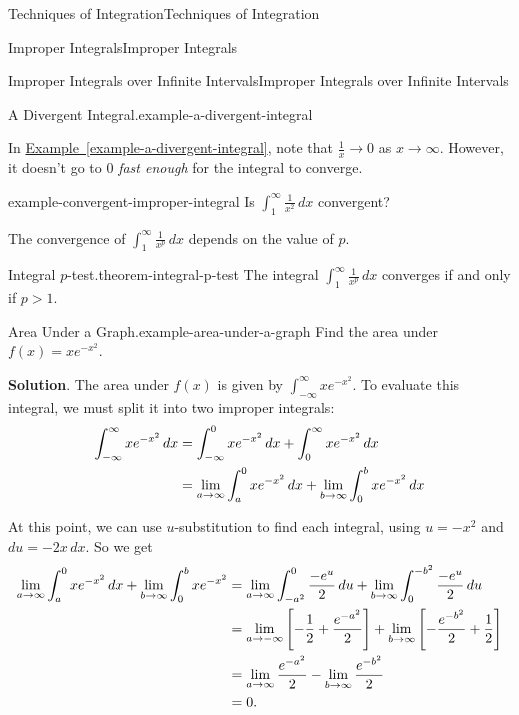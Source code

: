 \documentclass[10pt,]{book}
\numberwithin{equation}{section}
\newcommand{\gt}{>}
\begin{document}
\begin{chapterptx}{Techniques of Integration}{}{Techniques of Integration}{}{}
\begin{sectionptx}{Improper Integrals}{}{Improper Integrals}{}{}
\begin{subsectionptx}{Improper Integrals over Infinite Intervals}{}{Improper Integrals over Infinite Intervals}{}{}
\begin{example}{A Divergent Integral.}{example-a-divergent-integral}
\end{example}
\hypertarget{p-584}{}%
In \hyperref[example-a-divergent-integral]{Example~\ref{example-a-divergent-integral}}, note that \(\frac{1}{x}\to0\) as \(x\to\infty\). However, it doesn't go to \(0\) \emph{fast enough} for the integral to converge.%
\begin{example}{}{example-convergent-improper-integral}%
\hypertarget{p-585}{}%
Is \(\int_{1}^{\infty}\frac{1}{x^{2}}\,dx\) convergent?%
\end{example}
\hypertarget{p-586}{}%
The convergence of \(\int_{1}^{\infty}\frac{1}{x^{p}}\,dx\) depends on the value of \(p\).%
\begin{theorem}{Integral \(p\)-test.}{}{theorem-integral-p-test}%
\hypertarget{p-587}{}%
The integral \(\int_{1}^{\infty}\frac{1}{x^{p}}\,dx\) converges if and only if \(p \gt 1\).%
\end{theorem}
\begin{example}{Area Under a Graph.}{example-area-under-a-graph}%
\hypertarget{p-588}{}%
Find the area under \(f(x) = xe^{-x^{2}}\).%
\par\smallskip%
\noindent\textbf{Solution}.\hypertarget{solution-127}{}\quad%
\hypertarget{p-589}{}%
The area under \(f(x)\) is given by \(\int_{-\infty}^{\infty}xe^{-x^{2}}\). To evaluate this integral, we must split it into two improper integrals:%
\begin{align*}
\int_{-\infty}^{\infty}xe^{-x^{2}}\,dx & = \int_{-\infty}^{0}xe^{-x^{2}}\,dx + \int_{0}^{\infty}xe^{-x^{2}}\,dx \\
& = \lim_{a\to\-\infty}\int_{a}^{0}xe^{-x^{2}}\,dx + \lim_{b\to\infty}\int_{0}^{b}xe^{-x^{2}}\,dx 
\end{align*}
%
\par
\hypertarget{p-590}{}%
At this point, we can use \(u\)-substitution to find each integral, using \(u = -x^{2}\) and \(du = -2x\,dx\). So we get%
\begin{align*}
\lim_{a\to\-\infty}\int_{a}^{0}xe^{-x^{2}}\,dx + \lim_{b\to\infty}\int_{0}^{b}xe^{-x^{2}} & = \lim_{a\to\-\infty}\int_{-a^{2}}^{0}\frac{-e^{u}}{2}\,du + \lim_{b\to\infty}\int_{0}^{-b^{2}}\frac{-e^{u}}{2}\,du \\
& = \lim_{a\to-\infty}\left[-\frac{1}{2} + \frac{e^{-a^{2}}}{2}\right] + \lim_{b\to\infty}\left[-\frac{e^{-b^{2}}}{2} + \frac{1}{2}\right]\\
& = \lim_{a\to\infty}\frac{e^{-a^{2}}}{2} - \lim_{b\to\infty}\frac{e^{-b^{2}}}{2} \\
& = 0. 
\end{align*}

\end{example}
\end{subsectionptx}
\end{sectionptx}
\end{chapterptx}
\end{document}
